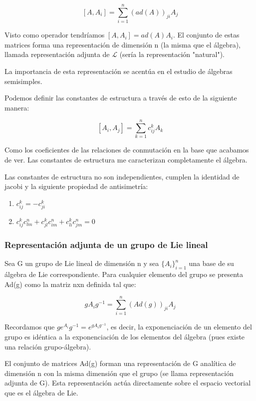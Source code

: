 \documentclass{article}
\begin{document}
      $$[A,A_i]=\sum _{i=1}^n (ad(A))_{ji}A_j$$

      Visto como operador tendríamos $[A,A_i]=ad(A)A_i$. El conjunto de estas matrices forma una representación de dimensión n (la misma que el álgebra), llamada representación adjunta de $\mathcal{L}$ (sería la representación "natural").

      La importancia de esta representación se acentúa en el estudio de álgebras semisimples.

     \smallskip
     Podemos definir las constantes de estructura a través de esto de la siguiente manera:

     $$[A_i,A_j]=\sum _{k=1}^n c_{ij}^k A_k$$

     Como los coeficientes de las relaciones de conmutación en la base que acabamos de ver. Las constantes de estructura me caracterizan completamente el álgebra.

     Las constantes de estructura no son independientes, cumplen la identidad de jacobi y la siguiente propiedad de antisimetría:

     \begin{enumerate}
     \item $     c_{ij}^k=-c_{ji}^k $
         \item $
          c_{ij}^kc_{lm}^n + c^k_{jl}c_{im}^n+ c_{li}^kc^n_{jm}=0 $
     \end{enumerate}


     \subsubsection{Representación adjunta de un grupo de Lie lineal}

     Sea G un grupo de Lie lineal de dimensión n y sea $\lbrace A_i \rbrace _{i=1}^n$ una base de su álgebra de Lie correspondiente. Para cualquier elemento del grupo se presenta Ad(g) como la matriz nxn definida tal que:

     $$gA_ig^{-1}=\sum _{i=1}^n (Ad(g))_{ji} A_j$$

     Recordamos que $ge^{A_i}g^{-1}=e^{gA_ig^{-1}}$, es decir, la exponenciación de un elemento del grupo es idéntica a la exponenciación de los elementos del álgebra (pues existe una relación grupo-álgebra).

     El conjunto de matrices Ad(g) forman una representación de G analítica de dimensión n con la misma dimensión que el grupo (se llama representación adjunta de G). Esta representación actúa directamente sobre el espacio vectorial que es el álgebra de Lie.
\end{document}

